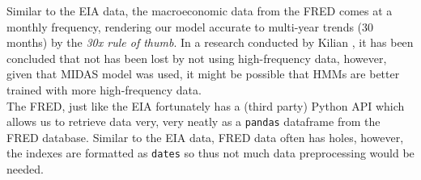 Similar to the EIA data, the macroeconomic data from the FRED comes at a monthly frequency, rendering our model accurate to multi-year trends (30 months) by the \emph{30x rule of thumb}. In a research conducted by Kilian \cite{hftoil}, it has been concluded that not has been lost by not using high-frequency data, however, given that MIDAS model was used, it might be possible that HMMs are better trained with more high-frequency data.\\

The FRED, just like the EIA fortunately has a (third party) Python API \cite{fredgit} which allows us to retrieve data very, very neatly as a \texttt{pandas} dataframe from the FRED database. Similar to the EIA data, FRED data often has holes, however, the indexes are formatted as \texttt{dates} so thus not much data preprocessing would be needed.\\
